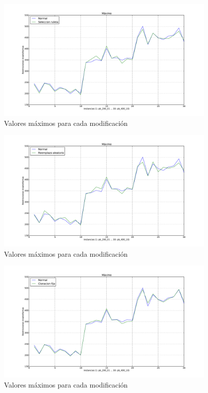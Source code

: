 \begin{figure}[H]
\begin{center}
\includegraphics[width=0.95\textwidth]{img/max-2.pdf}
\end{center}
\caption{Valores máximos para cada modificación}
\label{fig:max-2}
\end{figure}

\begin{figure}[H]
\begin{center}
\includegraphics[width=0.95\textwidth]{img/max-3.pdf}
\end{center}
\caption{Valores máximos para cada modificación}
\label{fig:max-3}
\end{figure}

\begin{figure}[H]
\begin{center}
\includegraphics[width=0.95\textwidth]{img/max-4.pdf}
\end{center}
\caption{Valores máximos para cada modificación}
\label{fig:max-4}
\end{figure}


